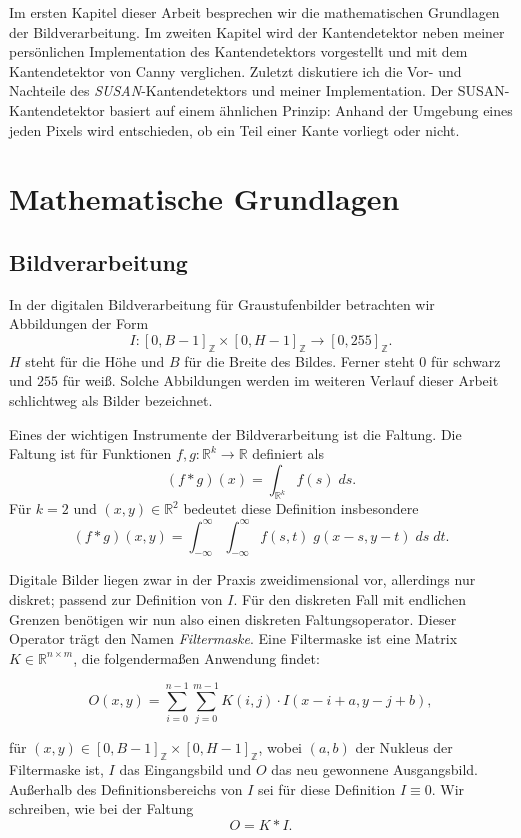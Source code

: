 \documentclass[a4paper, 11pt]{report}
\renewcommand{\emph}[1]{\textit{#1}}
\theoremstyle{definition}
\begin{document}
	Im ersten Kapitel dieser Arbeit besprechen wir die mathematischen Grundlagen der Bildverarbeitung. Im zweiten Kapitel wird der Kantendetektor neben meiner persönlichen Implementation des Kantendetektors vorgestellt und mit dem Kantendetektor von Canny verglichen. Zuletzt diskutiere ich die Vor- und Nachteile des \emph{SUSAN}-Kantendetektors und meiner Implementation. Der SUSAN-Kantendetektor basiert auf einem ähnlichen Prinzip: Anhand der Umgebung eines jeden Pixels wird entschieden, ob ein Teil einer Kante vorliegt oder nicht.

\chapter{Mathematische Grundlagen}
	\section{Bildverarbeitung}\label{sec:imageproc}
		In der digitalen Bildverarbeitung für Graustufenbilder betrachten wir Abbildungen der Form
		$$ I: [0, B-1]_\mathbb{Z} \times [0, H-1]_\mathbb{Z} \to [0,255]_\mathbb{Z}. $$
		$H$ steht für die Höhe und $B$ für die Breite des Bildes. Ferner steht $0$ für schwarz und $255$ für weiß. Solche Abbildungen werden im weiteren Verlauf dieser Arbeit schlichtweg als Bilder bezeichnet.

		Eines der wichtigen Instrumente der Bildverarbeitung ist die Faltung. Die Faltung ist für Funktionen $f,g : \mathbb{R}^k \to \mathbb{R}$ definiert als
		$$ (f * g)(x) = \int_{\mathbb{R}^k} f(s) \; ds.$$
		Für $k = 2$ und $(x,y) \in \mathbb{R}^2$ bedeutet diese Definition insbesondere
		$$ (f*g)(x, y) = \int_{-\infty}^{\infty} \int_{-\infty}^{\infty} f(s, t) \; g(x - s, y - t) \; ds \; dt.$$

		Digitale Bilder liegen zwar in der Praxis zweidimensional vor, allerdings nur diskret; passend zur Definition von $I$. Für den diskreten Fall mit endlichen Grenzen benötigen wir nun also einen diskreten Faltungsoperator. Dieser Operator trägt den Namen \emph{Filtermaske}.
		Eine Filtermaske ist eine Matrix $K \in \mathbb{R}^{n \times m}$, die folgendermaßen Anwendung findet:
		
		$$ O(x,y) = \sum_{i=0}^{n-1} \sum_{j=0}^{m-1} K(i,j) \cdot I(x-i+a, y-j+b),$$
		
		für $(x,y) \in [0, B-1]_\mathbb{Z} \times [0, H-1]_\mathbb{Z}$, wobei $(a,b)$ der Nukleus der Filtermaske ist, $I$ das Eingangsbild und $O$ das neu gewonnene Ausgangsbild. Außerhalb des Definitionsbereichs von $I$ sei für diese Definition $I \equiv 0$.
		Wir schreiben, wie bei der Faltung
		$$ O = K * I.$$
\end{document}
